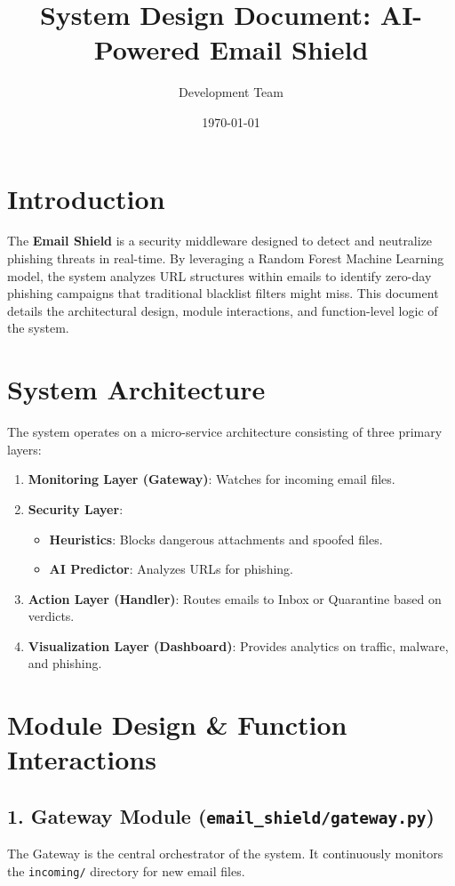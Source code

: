 \documentclass[11pt, a4paper]{article}
\title{\textbf{System Design Document: AI-Powered Email Shield}}
\author{Development Team}
\date{\today}
\begin{document}
\maketitle
\tableofcontents
\newpage

\section{Introduction}
The \textbf{Email Shield} is a security middleware designed to detect and neutralize phishing threats in real-time. By leveraging a Random Forest Machine Learning model, the system analyzes URL structures within emails to identify zero-day phishing campaigns that traditional blacklist filters might miss. This document details the architectural design, module interactions, and function-level logic of the system.

\section{System Architecture}
The system operates on a micro-service architecture consisting of three primary layers:
\begin{enumerate}
    \item \textbf{Monitoring Layer (Gateway)}: Watches for incoming email files.
    \item \textbf{Security Layer}:
        \begin{itemize}
            \item \textbf{Heuristics}: Blocks dangerous attachments and spoofed files.
            \item \textbf{AI Predictor}: Analyzes URLs for phishing.
        \end{itemize}
    \item \textbf{Action Layer (Handler)}: Routes emails to Inbox or Quarantine based on verdicts.
    \item \textbf{Visualization Layer (Dashboard)}: Provides analytics on traffic, malware, and phishing.
\end{enumerate}

\section{Module Design & Function Interactions}

\subsection{1. Gateway Module (\texttt{email\_shield/gateway.py})}
The Gateway is the central orchestrator of the system. It continuously monitors the \texttt{incoming/} directory for new email files.
\end{document}
